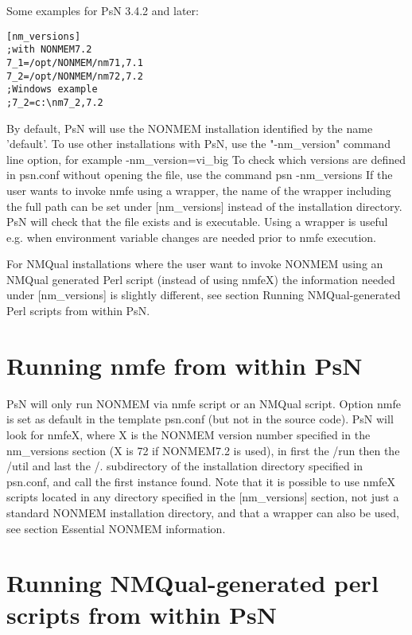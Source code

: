 \documentclass[a4paper,12pt]{article}
\begin{document}
Some examples for PsN 3.4.2 and later:
\begin{verbatim}
[nm_versions]
;with NONMEM7.2 
7_1=/opt/NONMEM/nm71,7.1
7_2=/opt/NONMEM/nm72,7.2
;Windows example
;7_2=c:\nm7_2,7.2
\end{verbatim}
By default, PsN will use the NONMEM installation identified by the name 'default'. To use other installations with PsN, use the "-nm\_version" command line option, for example -nm\_version=vi\_big
To check which versions are defined in psn.conf without opening the file, use the command 
psn -nm\_versions
If the user wants to invoke nmfe using a wrapper, the name of the wrapper including the full path can be set under [nm\_versions] instead of the installation directory. PsN will check that the file exists and is executable. Using a wrapper is useful e.g. when environment variable changes are needed prior to nmfe execution.

For NMQual installations where the user want to invoke NONMEM using an NMQual generated Perl script (instead of using nmfeX) the information needed under [nm\_versions] is slightly different, see section Running NMQual-generated Perl scripts from within PsN.


\section{Running nmfe from within PsN}

PsN will only run NONMEM via nmfe script or an NMQual script. Option nmfe is set as default in the template psn.conf (but not in the source code). PsN will look for nmfeX, where X is the NONMEM version number specified in the nm\_versions section (X is 72 if NONMEM7.2 is used),  in first the /run then the  /util and last the /. subdirectory of the installation directory specified in psn.conf, and call the first instance found. Note that it is possible to use nmfeX scripts located in any directory specified in the [nm\_versions] section, not just a standard NONMEM installation directory, and that a wrapper can also be used, see section Essential NONMEM information.

\section{Running  NMQual-generated perl scripts from within PsN}
\end{document}
